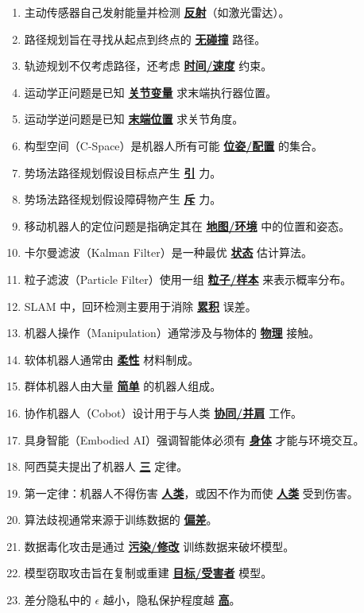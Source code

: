 \documentclass[12pt,a4paper,openany]{ctexbook}
\begin{document}
\begin{enumerate}[resume,leftmargin=2em,itemsep=1pt]
\item 主动传感器自己发射能量并检测 \underline{\textbf{反射}}（如激光雷达）。
\item 路径规划旨在寻找从起点到终点的 \underline{\textbf{无碰撞}} 路径。
\item 轨迹规划不仅考虑路径，还考虑 \underline{\textbf{时间/速度}} 约束。
\item 运动学正问题是已知 \underline{\textbf{关节变量}} 求末端执行器位置。
\item 运动学逆问题是已知 \underline{\textbf{末端位置}} 求关节角度。
\item 构型空间（C-Space）是机器人所有可能 \underline{\textbf{位姿/配置}} 的集合。
\item 势场法路径规划假设目标点产生 \underline{\textbf{引}} 力。
\item 势场法路径规划假设障碍物产生 \underline{\textbf{斥}} 力。
\item 移动机器人的定位问题是指确定其在 \underline{\textbf{地图/环境}} 中的位置和姿态。
\item 卡尔曼滤波（Kalman Filter）是一种最优 \underline{\textbf{状态}} 估计算法。
\item 粒子滤波（Particle Filter）使用一组 \underline{\textbf{粒子/样本}} 来表示概率分布。
\item SLAM 中，回环检测主要用于消除 \underline{\textbf{累积}} 误差。
\item 机器人操作（Manipulation）通常涉及与物体的 \underline{\textbf{物理}} 接触。
\item 软体机器人通常由 \underline{\textbf{柔性}} 材料制成。
\item 群体机器人由大量 \underline{\textbf{简单}} 的机器人组成。
\item 协作机器人（Cobot）设计用于与人类 \underline{\textbf{协同/并肩}} 工作。
\item 具身智能（Embodied AI）强调智能体必须有 \underline{\textbf{身体}} 才能与环境交互。
\item 阿西莫夫提出了机器人 \underline{\textbf{三}} 定律。
\item 第一定律：机器人不得伤害 \underline{\textbf{人类}}，或因不作为而使 \underline{\textbf{人类}} 受到伤害。
\item 算法歧视通常来源于训练数据的 \underline{\textbf{偏差}}。
\item 数据毒化攻击是通过 \underline{\textbf{污染/修改}} 训练数据来破坏模型。
\item 模型窃取攻击旨在复制或重建 \underline{\textbf{目标/受害者}} 模型。
\item 差分隐私中的 $\epsilon$ 越小，隐私保护程度越 \underline{\textbf{高}}。

\end{enumerate}
\end{document}
